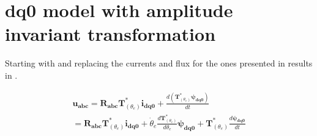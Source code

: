 \chapter{dq0 model with amplitude invariant transformation}
\label{chapter:appendixdq0_amplitude}

Starting with  and replacing the currents and flux for the ones presented in  results in .

\begin{equation}
	\begin{aligned}
		\mathbf{u_{abc}}
		=
		\mathbf{R_{abc}}
		\mathbf{T}^*_{(\theta_e)} \mathbf{i_{dq0}}
		+
		\frac{d\left(\mathbf{T}^*_{(\theta_e)} \pmb{\psi_{dq0}}\right)}{dt}
		\\
		=
		\mathbf{R_{abc}}
		\mathbf{T}^*_{(\theta_e)} \mathbf{i_{dq0}}
		+\dot{\theta}_e\frac{d\mathbf{T}^*_{(\theta_e)}}{d\theta_e}\pmb{\psi_{dq0}}
		+\mathbf{T}^*_{(\theta_e)}\frac{d \pmb{\psi_{dq0}}}{dt}
	\end{aligned}
	\label{eq:flx_voltage_balance_abc_to_dq}
\end{equation}

